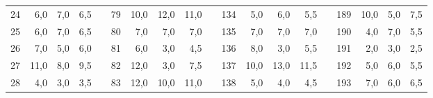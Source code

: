 \begin{table}[H]
{\begin{tabular}{|c|r|r|r|l|c|r|r|r|l|c|r|r|r|lcrrr}
24                                                    & 6,0                                                                       & 7,0                                                                       & 6,5                                                                       &  & 79  & 10,0 & 12,0 & 11,0 &  & 134 & 5,0  & 6,0  & 5,5  & \multicolumn{1}{l|}{} & \multicolumn{1}{c|}{189} & \multicolumn{1}{r|}{10,0} & \multicolumn{1}{r|}{5,0}  & \multicolumn{1}{r|}{7,5}  \\ \cline{1-4} \cline{6-9} \cline{11-14} \cline{16-19} 
25                                                    & 6,0                                                                       & 7,0                                                                       & 6,5                                                                       &  & 80  & 7,0  & 7,0  & 7,0  &  & 135 & 7,0  & 7,0  & 7,0  & \multicolumn{1}{l|}{} & \multicolumn{1}{c|}{190} & \multicolumn{1}{r|}{4,0}  & \multicolumn{1}{r|}{7,0}  & \multicolumn{1}{r|}{5,5}  \\ \cline{1-4} \cline{6-9} \cline{11-14} \cline{16-19} 
26                                                    & 7,0                                                                       & 5,0                                                                       & 6,0                                                                       &  & 81  & 6,0  & 3,0  & 4,5  &  & 136 & 8,0  & 3,0  & 5,5  & \multicolumn{1}{l|}{} & \multicolumn{1}{c|}{191} & \multicolumn{1}{r|}{2,0}  & \multicolumn{1}{r|}{3,0}  & \multicolumn{1}{r|}{2,5}  \\ \cline{1-4} \cline{6-9} \cline{11-14} \cline{16-19} 
27                                                    & 11,0                                                                      & 8,0                                                                       & 9,5                                                                       &  & 82  & 12,0 & 3,0  & 7,5  &  & 137 & 10,0 & 13,0 & 11,5 & \multicolumn{1}{l|}{} & \multicolumn{1}{c|}{192} & \multicolumn{1}{r|}{5,0}  & \multicolumn{1}{r|}{6,0}  & \multicolumn{1}{r|}{5,5}  \\ \cline{1-4} \cline{6-9} \cline{11-14} \cline{16-19} 
28                                                    & 4,0                                                                       & 3,0                                                                       & 3,5                                                                       &  & 83  & 12,0 & 10,0 & 11,0 &  & 138 & 5,0  & 4,0  & 4,5  & \multicolumn{1}{l|}{} & \multicolumn{1}{c|}{193} & \multicolumn{1}{r|}{7,0}  & \multicolumn{1}{r|}{6,0}  & \multicolumn{1}{r|}{6,5}  \\ \cline{1-4} \cline{6-9} \cline{11-14} \cline{16-19} 

\end{tabular}}
\end{table}
